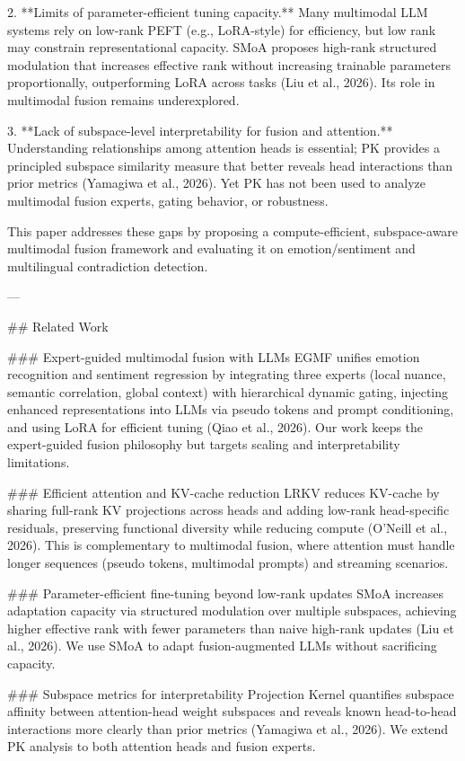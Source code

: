 2. **Limits of parameter-efficient tuning capacity.** Many multimodal LLM systems rely on low-rank PEFT (e.g., LoRA-style) for efficiency, but low rank may constrain representational capacity. SMoA proposes high-rank structured modulation that increases effective rank without increasing trainable parameters proportionally, outperforming LoRA across tasks (Liu et al., 2026). Its role in multimodal fusion remains underexplored.

3. **Lack of subspace-level interpretability for fusion and attention.** Understanding relationships among attention heads is essential; PK provides a principled subspace similarity measure that better reveals head interactions than prior metrics (Yamagiwa et al., 2026). Yet PK has not been used to analyze multimodal fusion experts, gating behavior, or robustness.

This paper addresses these gaps by proposing a compute-efficient, subspace-aware multimodal fusion framework and evaluating it on emotion/sentiment and multilingual contradiction detection.

---

## Related Work  

### Expert-guided multimodal fusion with LLMs  
EGMF unifies emotion recognition and sentiment regression by integrating three experts (local nuance, semantic correlation, global context) with hierarchical dynamic gating, injecting enhanced representations into LLMs via pseudo tokens and prompt conditioning, and using LoRA for efficient tuning (Qiao et al., 2026). Our work keeps the expert-guided fusion philosophy but targets scaling and interpretability limitations.

### Efficient attention and KV-cache reduction  
LRKV reduces KV-cache by sharing full-rank KV projections across heads and adding low-rank head-specific residuals, preserving functional diversity while reducing compute (O’Neill et al., 2026). This is complementary to multimodal fusion, where attention must handle longer sequences (pseudo tokens, multimodal prompts) and streaming scenarios.

### Parameter-efficient fine-tuning beyond low-rank updates  
SMoA increases adaptation capacity via structured modulation over multiple subspaces, achieving higher effective rank with fewer parameters than naive high-rank updates (Liu et al., 2026). We use SMoA to adapt fusion-augmented LLMs without sacrificing capacity.

### Subspace metrics for interpretability  
Projection Kernel quantifies subspace affinity between attention-head weight subspaces and reveals known head-to-head interactions more clearly than prior metrics (Yamagiwa et al., 2026). We extend PK analysis to both attention heads and fusion experts.

